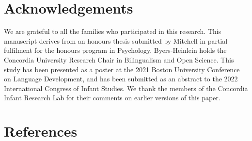 \documentclass[
  english,
  ,man,floatsintext]{apa6}
\begin{document}
\newpage

\hypertarget{acknowledgements}{%
\section{Acknowledgements}\label{acknowledgements}}

\noindent We are grateful to all the families who participated in this research. This manuscript derives from an honours thesis submitted by Mitchell in partial fulfilment for the honours program in Psychology. Byers-Heinlein holds the Concordia University Research Chair in Bilingualism and Open Science. This study has been presented as a poster at the 2021 Boston University Conference on Language Development, and has been submitted as an abstract to the 2022 International Congress of Infant Studies. We thank the members of the Concordia Infant Research Lab for their comments on earlier versions of this paper.

\newpage

\hypertarget{references}{%
\section{References}\label{references}}

\begingroup
\setlength{\parindent}{-0.5in}
\end{document}
